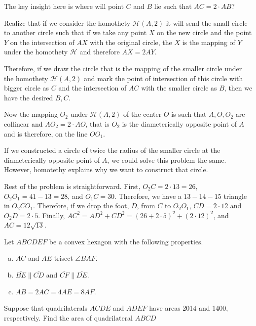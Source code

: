\documentclass[11pt,twoside]{scrartcl}
\begin{document}
\begin{soln}
    The key insight here is where will point $C$ and $B$ lie such that $AC = 2 \cdot AB$? 

    Realize that if we consider the homothety $\mathcal{H}(A, 2)$ it will send the small circle to another circle such that if we take any point $X$ on the new circle and the point $Y$ on the intersection of $AX$ with the original circle, the $X$ is the mapping of $Y$ under the homothety $\mathcal{H}$ and therefore $AX = 2 AY$.

    Therefore, if we draw the circle that is the mapping of the smaller circle under the homothety $\mathcal{H}(A, 2)$ and mark the point of intersection of this circle with bigger circle as $C$ and the intersection of $AC$ with the smaller circle as $B$, then we have the desired $B, C$.

    Now the mapping $O_2$ under $\mathcal{H}(A, 2)$ of the center $O$ is such that $A, O, O_2$ are collinear and $AO_2 = 2 \cdot AO$, that is $O_2$ is the diameterically opposite point of $A$ and is therefore, on the line $OO_1$.
    
    \begin{note}
        If we constructed a circle of twice the radius of the smaller circle at the diameterically opposite point of $A$, we could solve this problem the same. However, homotethy explains why we want to construct that circle.
    \end{note}

    Rest of the problem is straightforward. First, $O_2C = 2 \cdot 13 = 26$, $O_2O_1 = 41 - 13 = 28$, and $O_1C = 30$. Therefore, we have a $13-14-15$ triangle in $O_2CO_1$. Therefore, if we drop the foot, $D$, from $C$ to $O_2O_1$, $CD = 2\cdot12$ and $O_2D = 2\cdot5$. Finally, $AC^2 = AD^2 + CD^2 = (26+2\cdot5)^2 + (2\cdot12)^2$, and $AC = \boxed{12\sqrt{13}}$.
\end{soln}

\begin{example} \label{hmmt_nov14_team_10}
    Let $ABCDEF$ be a convex hexagon with the following properties.
    \begin{enumerate}[a)]
        \item $\overline{AC}$ and $\overline{AE}$ trisect $\angle BAF$.
        \item $\overline{BE} \parallel \overline{CD}$ and $\overline{CF} \parallel \overline{DE}$.
        \item $AB = 2AC = 4AE = 8AF$.
    \end{enumerate}
    Suppose that quadrilaterals $ACDE$ and $ADEF$ have areas 2014 and 1400, respectively. Find the area of quadrilateral $ABCD$

\end{example}
\end{document}
